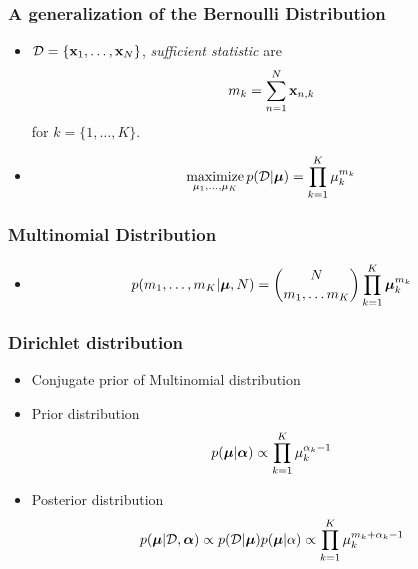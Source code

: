 \documentclass[10pt,mathserif]{beamer}
\begin{document}
\begin{frame}
\frametitle{A generalization of the Bernoulli Distribution}
\begin{itemize}
\item $\mathcal{D} = \{\mathbf{x}_1,\ldots,\mathbf{x}_N\}$, \textit{sufficient statistic} are 
\begin{align}
m_k= \sum_{n=1}^N \mathbf{x}_{n,k}\nonumber
\end{align}
for $k=\{1,\ldots,K\}$.

\item
\begin{align}
    \operatorname*{maximize}_{\mu_1,\ldots,\mu_K} p(\mathcal{D}| \boldsymbol{\mu}) = \prod_{k=1}^K \mu_k^{m_k}\nonumber
\end{align}
\end{itemize}
\end{frame}
\begin{frame}
\frametitle{Multinomial Distribution}
\begin{itemize}
\item 
\begin{align}
p(m_1,\ldots,m_K|\boldsymbol{\mu}, N) = {N \choose m_1,\ldots m_K} \prod_{k=1}^K \boldsymbol{\mu}_k^{m_k} \nonumber
\end{align}
\end{itemize}
\end{frame}

\begin{frame}
\frametitle{Dirichlet distribution}
\begin{itemize}
\item Conjugate prior of Multinomial distribution
\item Prior distribution
\begin{align} 
p(\boldsymbol{\mu}| \boldsymbol{\alpha}) \propto \prod_{k=1}^K \mu_k^{\alpha_k-1} \nonumber
\end{align}
\item Posterior distribution
\begin{align} 
p(\boldsymbol{\mu}| \mathcal{D}, \boldsymbol{\alpha}) \propto p(\mathcal{D} | \boldsymbol{\mu})p(\boldsymbol{\mu} | \alpha) \propto \prod_{k=1}^K \mu_k^{m_k+\alpha_k-1} \nonumber
\end{align}
\end{itemize}
\end{frame}
\end{document}
